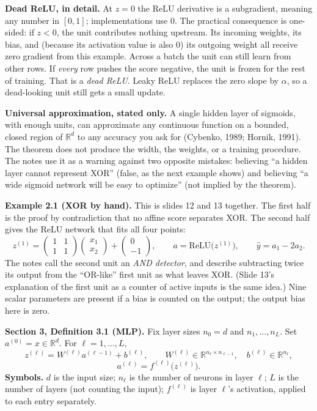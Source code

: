 \textbf{Dead ReLU, in detail.} At $z=0$ the ReLU derivative is a subgradient, meaning any number in $[0,1]$; implementations use $0$. The practical consequence is one-sided: if $z<0$, the unit contributes nothing upstream. Its incoming weights, its bias, and (because its activation value is also $0$) its outgoing weight all receive zero gradient from this example. Across a batch the unit can still learn from other rows. If \emph{every} row pushes the score negative, the unit is frozen for the rest of training. That is a \emph{dead ReLU}. Leaky ReLU replaces the zero slope by $\alpha$, so a dead-looking unit still gets a small update.

\textbf{Universal approximation, stated only.} A single hidden layer of sigmoids, with enough units, can approximate any continuous function on a bounded, closed region of $\mathbb{R}^d$ to any accuracy you ask for (Cybenko, 1989; Hornik, 1991). The theorem does not produce the width, the weights, or a training procedure. The notes use it as a warning against two opposite mistakes: believing ``a hidden layer cannot represent XOR'' (false, as the next example shows) and believing ``a wide sigmoid network will be easy to optimize'' (not implied by the theorem).

\textbf{Example 2.1 (XOR by hand).} This is slides 12 and 13 together. The first half is the proof by contradiction that no affine score separates XOR. The second half gives the ReLU network that fits all four points:
\[
z^{(1)}=\begin{pmatrix}1&1\\1&1\end{pmatrix}\begin{pmatrix}x_1\\x_2\end{pmatrix}+\begin{pmatrix}0\\-1\end{pmatrix}, \qquad a=\text{ReLU}\big(z^{(1)}\big), \qquad \hat{y}=a_1-2a_2 .
\]
The notes call the second unit an \emph{AND detector}, and describe subtracting twice its output from the ``OR-like'' first unit as what leaves XOR. (Slide 13's explanation of the first unit as a counter of active inputs is the same idea.) Nine scalar parameters are present if a bias is counted on the output; the output bias here is zero.

\textbf{Section 3, Definition 3.1 (MLP).} Fix layer sizes $n_0=d$ and $n_1,\dots,n_L$. Set $a^{(0)}=x\in\mathbb{R}^d$. For $\ell=1,\dots,L$,
\[
z^{(\ell)}=W^{(\ell)}a^{(\ell-1)}+b^{(\ell)}, \qquad W^{(\ell)}\in\mathbb{R}^{n_\ell\times n_{\ell-1}}, \quad b^{(\ell)}\in\mathbb{R}^{n_\ell}, \tag{4}
\]
\[
a^{(\ell)}=f^{(\ell)}\big(z^{(\ell)}\big). \tag{5}
\]
\textbf{Symbols.} $d$ is the input size; $n_\ell$ is the number of neurons in layer $\ell$; $L$ is the number of layers (not counting the input); $f^{(\ell)}$ is layer $\ell$'s activation, applied to each entry separately.

